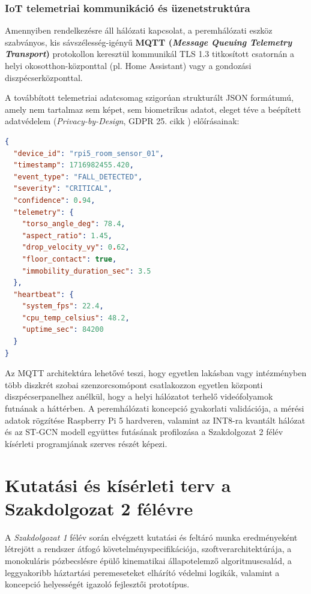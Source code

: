 \documentclass[12pt,a4paper,oneside]{report}
\begin{document}
\subsection{IoT telemetriai kommunikáció és üzenetstruktúra}
Amennyiben rendelkezésre áll hálózati kapcsolat, a peremhálózati eszköz szabványos, kis sávszélesség-igényű \textbf{MQTT (\textit{Message Queuing Telemetry Transport})} protokollon keresztül kommunikál TLS 1.3 titkosított csatornán a helyi okosotthon-központtal (pl. Home Assistant) vagy a gondozási diszpécserközponttal.

A továbbított telemetriai adatcsomag szigorúan strukturált JSON formátumú, amely nem tartalmaz sem képet, sem biometrikus adatot, eleget téve a beépített adatvédelem (\textit{Privacy-by-Design}, GDPR 25. cikk \cite{gdpr2016}) előírásainak:
\begin{lstlisting}[language=json, caption={Példa esésdetektálási JSON telemetriai adatcsomagra.}]
{
  "device_id": "rpi5_room_sensor_01",
  "timestamp": 1716982455.420,
  "event_type": "FALL_DETECTED",
  "severity": "CRITICAL",
  "confidence": 0.94,
  "telemetry": {
    "torso_angle_deg": 78.4,
    "aspect_ratio": 1.45,
    "drop_velocity_vy": 0.62,
    "floor_contact": true,
    "immobility_duration_sec": 3.5
  },
  "heartbeat": {
    "system_fps": 22.4,
    "cpu_temp_celsius": 48.2,
    "uptime_sec": 84200
  }
}
\end{lstlisting}

Az MQTT architektúra lehetővé teszi, hogy egyetlen lakásban vagy intézményben több diszkrét szobai szenzorcsomópont csatlakozzon egyetlen központi diszpécserpanelhez anélkül, hogy a helyi hálózatot terhelő videófolyamok futnának a háttérben. A peremhálózati koncepció gyakorlati validációja, a mérési adatok rögzítése Raspberry Pi 5 hardveren, valamint az INT8-ra kvantált hálózat és az ST-GCN modell együttes futásának profilozása a Szakdolgozat 2 félév kísérleti programjának szerves részét képezi.


\chapter{Kutatási és kísérleti terv a Szakdolgozat 2 félévre}

A \textit{Szakdolgozat 1} félév során elvégzett kutatási és feltáró munka eredményeként létrejött a rendszer átfogó követelményspecifikációja, szoftverarchitektúrája, a monokuláris pózbecslésre épülő kinematikai állapotelemző algoritmuscsalád, a leggyakoribb háztartási peremeseteket elhárító védelmi logikák, valamint a koncepció helyességét igazoló fejlesztői prototípus.
\end{document}
